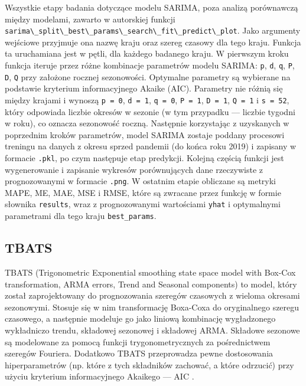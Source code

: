 \documentclass[polish, twoside, 12pt, a4paper]{article}
\theoremstyle{definition}
\theoremstyle{plain}
\theoremstyle{remark}
\newcommand{\code}[1]{\lstinline{#1}}
\begin{document}
Wszystkie etapy badania dotyczące modelu SARIMA, poza analizą porównawczą między modelami, zawarto w autorskiej funkcji \code{sarima\_split\_best\_params\_search\_fit\_predict\_plot}. Jako argumenty wejściowe przyjmuje ona nazwę kraju oraz szereg czasowy dla tego kraju. Funkcja ta uruchamiana jest w pętli, dla każdego badanego kraju. W pierwszym kroku funkcja iteruje przez różne kombinacje parametrów modelu SARIMA: \code{p}, \code{d}, \code{q}, \code{P}, \code{D}, \code{Q} przy założone rocznej sezonowości. Optymalne parametry są wybierane na podstawie kryterium informacyjnego Akaike (AIC). Parametry nie różnią się między krajami i wynoszą \code{p = 0}, \code{d = 1}, \code{q = 0}, \code{P = 1}, \code{D = 1}, \code{Q = 1} i \code{s = 52}, który odpowiada liczbie okresów w sezonie (w tym przypadku --- liczbie tygodni w roku), co oznacza sezonowość roczną. Następnie korzystając z uzyskanych w poprzednim kroków parametrów, model SARIMA zostaje poddany procesowi treningu na danych z okresu sprzed pandemii (do końca roku 2019) i zapisany w formacie \code{.pkl}, po czym następuje etap predykcji. Kolejną częścią funkcji jest wygenerowanie i zapisanie wykresów porównujących dane rzeczywiste z prognozowanymi w formacie \code{.png}. W ostatnim etapie obliczane są metryki MAPE, ME, MAE, MSE i RMSE, które są zwracane przez funkcję w formie słownika \code{results}, wraz z prognozowanymi wartościami \code{yhat} i optymalnymi parametrami dla tego kraju \code{best_params}.
	
\subsection{TBATS}

TBATS (Trigonometric Exponential smoothing state space model with Box-Cox transformation, ARMA errors, Trend and Seasonal components) to model, który został zaprojektowany do prognozowania szeregów czasowych z wieloma okresami sezonowymi. Stosuje się w nim transformację Boxa-Coxa do oryginalnego szeregu czasowego, a następnie modeluje go jako liniową kombinację wygładzonego wykładniczo trendu, składowej sezonowej i składowej ARMA. Składowe sezonowe są modelowane za pomocą funkcji trygonometrycznych za pośrednictwem szeregów Fouriera. Dodatkowo TBATS przeprowadza pewne dostosowania hiperparametrów (np. które z tych składników zachować, a które odrzucić) przy użyciu kryterium informacyjnego Akaikego --- AIC \citep{hyndman2014}.
\end{document}
